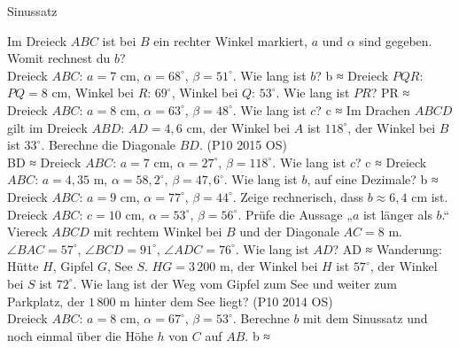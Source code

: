 \setcounter{aufgabe}{25}

\begin{aufgabe}{Sinussatz}
\begin{teile}
\teil Im Dreieck $ABC$ ist bei $B$ ein rechter Winkel markiert, $a$ und $\alpha$ sind gegeben. Womit rechnest du $b$? \\  
\teil Dreieck $ABC$: $a = 7$ cm, $\alpha = 68^\circ$, $\beta = 51^\circ$. Wie lang ist $b$? b ≈ \leerfeld[cm]
\teil Dreieck $PQR$: $PQ = 8$ cm, Winkel bei $R$: $69^\circ$, Winkel bei $Q$: $53^\circ$. Wie lang ist $PR$? PR ≈ \leerfeld[cm]
\teil Dreieck $ABC$: $a = 8$ cm, $\alpha = 63^\circ$, $\beta = 48^\circ$. Wie lang ist $c$? c ≈ \leerfeld[cm]
\teil Im Drachen $ABCD$ gilt im Dreieck $ABD$: $AD = 4{,}6$ cm, der Winkel bei $A$ ist $118^\circ$, der Winkel bei $B$ ist $33^\circ$. Berechne die Diagonale $BD$. \hfill (P10 2015 OS) \\ BD ≈ \leerfeld[cm]
\teil Dreieck $ABC$: $a = 7$ cm, $\alpha = 27^\circ$, $\beta = 118^\circ$. Wie lang ist $c$? c ≈ \leerfeld[cm]
\teil Dreieck $ABC$: $a = 4{,}35$ m, $\alpha = 58{,}2^\circ$, $\beta = 47{,}6^\circ$. Wie lang ist $b$, auf eine Dezimale? b ≈ \leerfeld[m]
\teil Dreieck $ABC$: $a = 9$ cm, $\alpha = 77^\circ$, $\beta = 44^\circ$. Zeige rechnerisch, dass $b \approx 6{,}4$ cm ist.
\teil Dreieck $ABC$: $c = 10$ cm, $\alpha = 53^\circ$, $\beta = 56^\circ$. Prüfe die Aussage „$a$ ist länger als $b$.“
\teil Viereck $ABCD$ mit rechtem Winkel bei $B$ und der Diagonale $AC = 8$ m. $\angle BAC = 57^\circ$, $\angle BCD = 91^\circ$, $\angle ADC = 76^\circ$. Wie lang ist $AD$? AD ≈ \leerfeld[m]
\teil Wanderung: Hütte $H$, Gipfel $G$, See $S$. $HG = 3\,200$ m, der Winkel bei $H$ ist $57^\circ$, der Winkel bei $S$ ist $72^\circ$. Wie lang ist der Weg vom Gipfel zum See und weiter zum Parkplatz, der $1\,800$ m hinter dem See liegt? \hfill (P10 2014 OS) \\ \leerfeld[km]
\teil Dreieck $ABC$: $a = 8$ cm, $\alpha = 67^\circ$, $\beta = 53^\circ$. Berechne $b$ mit dem Sinussatz und noch einmal über die Höhe $h$ von $C$ auf $AB$. b ≈ \leerfeld[cm]

\end{teile}
\end{aufgabe}
